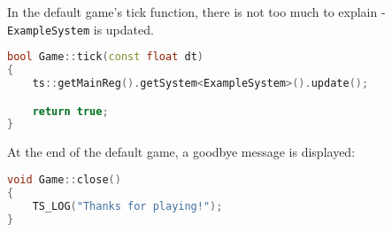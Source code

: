 In the default game's tick function, there is not too much to explain - \texttt{ExampleSystem} is updated.
\begin{lstlisting}[language=c++, caption=An example of a game \texttt{tick} function (./game/game.cpp)]
bool Game::tick(const float dt)
{
    ts::getMainReg().getSystem<ExampleSystem>().update();

    return true;
}
\end{lstlisting}
At the end of the default game, a goodbye message is displayed:
\begin{lstlisting}[language=c++, caption=An example of a game \texttt{close} function (./game/game.cpp)]
void Game::close()
{
    TS_LOG("Thanks for playing!");
}
\end{lstlisting}